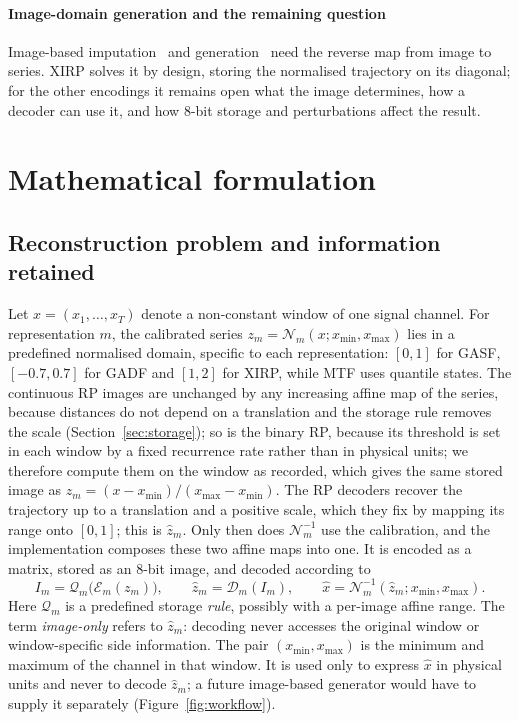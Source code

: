 \documentclass[preprint,review,12pt]{elsarticle}
\begin{document}
\paragraph{Image-domain generation and the remaining question}
Image-based imputation~\cite{huang2023tsdigan} and generation~\cite{hellermann2026imagegan} need the reverse map from image to series. XIRP solves it by design, storing the normalised trajectory on its diagonal; for the other encodings it remains open what the image determines, how a decoder can use it, and how 8-bit storage and perturbations affect the result.

\section{Mathematical formulation}\label{sec:formulation}

\subsection{Reconstruction problem and information retained}

Let $x=(x_1,\ldots,x_T)$ denote a non-constant window of one signal channel. For representation $m$, the calibrated series $z_m=\mathcal N_m(x;x_{\min},x_{\max})$ lies in a predefined normalised domain, specific to each representation: $[0,1]$ for GASF, $[-0.7,0.7]$ for GADF and $[1,2]$ for XIRP, while MTF uses quantile states. The continuous RP images are unchanged by any increasing affine map of the series, because distances do not depend on a translation and the storage rule removes the scale (Section~\ref{sec:storage}); so is the binary RP, because its threshold is set in each window by a fixed recurrence rate rather than in physical units; we therefore compute them on the window as recorded, which gives the same stored image as $z_m=(x-x_{\min})/(x_{\max}-x_{\min})$. The RP decoders recover the trajectory up to a translation and a positive scale, which they fix by mapping its range onto $[0,1]$; this is $\hat z_m$. Only then does $\mathcal N_m^{-1}$ use the calibration, and the implementation composes these two affine maps into one. It is encoded as a matrix, stored as an 8-bit image, and decoded according to
\[
I_m=\mathcal Q_m\bigl(\mathcal E_m(z_m)\bigr),\qquad
\hat z_m=\mathcal D_m(I_m),\qquad
\hat x=\mathcal N_m^{-1}(\hat z_m;x_{\min},x_{\max}).
\]
Here $\mathcal Q_m$ is a predefined storage \emph{rule}, possibly with a per-image affine range. The term \emph{image-only} refers to $\hat z_m$: decoding never accesses the original window or window-specific side information. The pair $(x_{\min},x_{\max})$ is the minimum and maximum of the channel in that window. It is used only to express $\hat x$ in physical units and never to decode $\hat z_m$; a future image-based generator would have to supply it separately (Figure~\ref{fig:workflow}).
\end{document}
